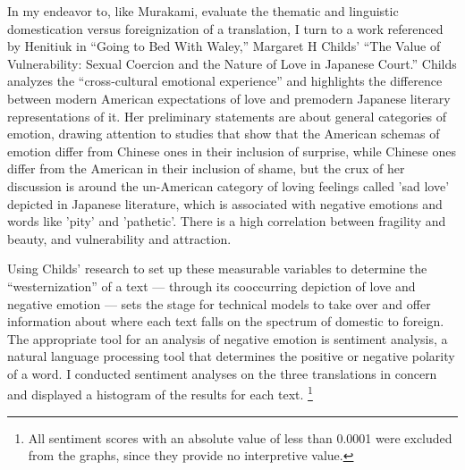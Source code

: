 \documentclass[12pt]{article}
\begin{document}
\begin{flushleft}
\begin{spacing}{2.0}
In my endeavor to, like Murakami, evaluate the thematic and linguistic domestication versus foreignization of a translation, I turn to a work referenced by Henitiuk in ``Going to Bed With Waley,'' Margaret H Childs' ``The Value of Vulnerability: Sexual Coercion and the Nature of Love in Japanese Court.'' Childs analyzes the ``cross-cultural emotional experience'' and highlights the difference between modern American expectations of love and premodern Japanese literary representations of it. Her preliminary statements are about general categories of emotion, drawing attention to studies that show that the American schemas of emotion differ from Chinese ones in their inclusion of surprise, while Chinese ones differ from the American in their inclusion of shame, but the crux of her discussion is around the un-American category of loving feelings called 'sad love' depicted in Japanese literature, which is associated with negative emotions and words like 'pity' and 'pathetic'. There is a high correlation between fragility and beauty, and vulnerability and attraction.

Using Childs' research to set up these measurable variables to determine the ``westernization'' of a text --- through its cooccurring depiction of love and negative emotion --- sets the stage for technical models to take over and offer information about where each text falls on the spectrum of domestic to foreign. The appropriate tool for an analysis of negative emotion is sentiment analysis, a natural language processing tool that determines the positive or negative polarity of a word. I conducted sentiment analyses on the three translations in concern and displayed a histogram of the results for each text. \footnote{All sentiment scores with an absolute value of less than 0.0001 were excluded from the graphs, since they provide no interpretive value.}


\end{spacing}
\end{flushleft}
\end{document}
